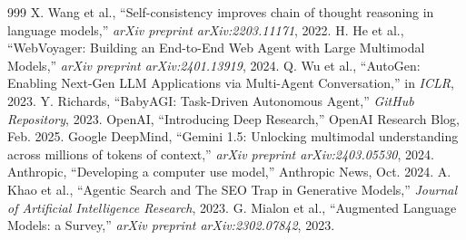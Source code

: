 \documentclass[12pt,oneside]{report}
\begin{document}
\begin{thebibliography}{999}
 X. Wang et al., ``Self-consistency improves chain of thought reasoning in language models,'' \textit{arXiv preprint arXiv:2203.11171}, 2022.
 H. He et al., ``WebVoyager: Building an End-to-End Web Agent with Large Multimodal Models,'' \textit{arXiv preprint arXiv:2401.13919}, 2024.
 Q. Wu et al., ``AutoGen: Enabling Next-Gen LLM Applications via Multi-Agent Conversation,'' in \textit{ICLR}, 2023.
 Y. Richards, ``BabyAGI: Task-Driven Autonomous Agent,'' \textit{GitHub Repository}, 2023.
 OpenAI, ``Introducing Deep Research,'' OpenAI Research Blog, Feb. 2025.
 Google DeepMind, ``Gemini 1.5: Unlocking multimodal understanding across millions of tokens of context,'' \textit{arXiv preprint arXiv:2403.05530}, 2024.
 Anthropic, ``Developing a computer use model,'' Anthropic News, Oct. 2024.
 A. Khao et al., ``Agentic Search and The SEO Trap in Generative Models,'' \textit{Journal of Artificial Intelligence Research}, 2023.
 G. Mialon et al., ``Augmented Language Models: a Survey,'' \textit{arXiv preprint arXiv:2302.07842}, 2023.


\end{thebibliography}
\end{document}
